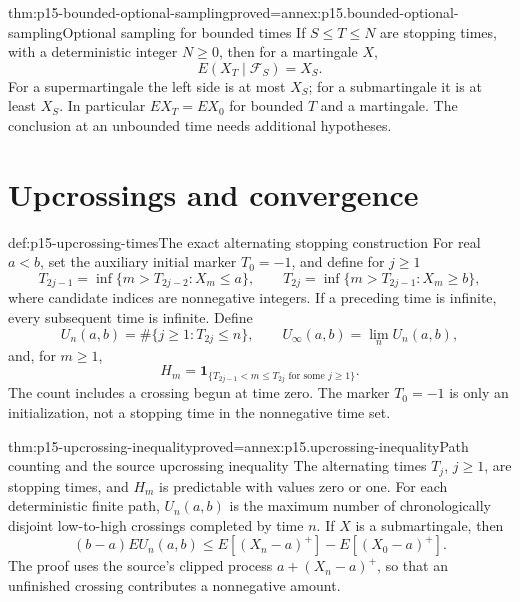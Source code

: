 \begin{hbtheorem}{thm:p15-bounded-optional-sampling}{proved=annex:p15.bounded-optional-sampling}{Optional sampling for bounded times}
If \(S\leq T\leq N\) are stopping times, with a deterministic
integer \(N\geq0\),
then for a martingale \(X\),
\[
                              E(X_T\mid\mathcal F_S)=X_S.
\]
For a supermartingale the left side is at most \(X_S\); for a
submartingale it is at least \(X_S\).
In particular \(EX_T=EX_0\) for bounded \(T\) and a martingale.
The conclusion at an unbounded time needs additional hypotheses.
\end{hbtheorem}

\section{Upcrossings and convergence}
\label{sec:p15-martingale-upcrossings}

\begin{hbdefinition}{def:p15-upcrossing-times}{The exact alternating stopping construction}
For real \(a<b\), set the auxiliary initial marker \(T_0=-1\), and define
for \(j\geq1\)
\[
 T_{2j-1}=\inf\{m>T_{2j-2}:X_m\leq a\},\qquad
 T_{2j}=\inf\{m>T_{2j-1}:X_m\geq b\},
\]
where candidate indices are nonnegative integers.
If a preceding time is infinite, every subsequent time is infinite.
Define
\[
 U_n(a,b)=\#\{j\geq1:T_{2j}\leq n\},\qquad
 U_\infty(a,b)=\lim_nU_n(a,b),
\]
and, for \(m\geq1\),
\[
 H_m=\mathbf1_{\{T_{2j-1}<m\leq T_{2j}\text{ for some }j\geq1\}}.
\]
The count includes a crossing begun at time zero. The marker \(T_0=-1\)
is only an initialization, not a stopping time in the nonnegative time set.
\end{hbdefinition}

\begin{hbtheorem}{thm:p15-upcrossing-inequality}{proved=annex:p15.upcrossing-inequality}{Path counting and the source upcrossing inequality}
The alternating times \(T_j\), \(j\geq1\), are stopping times, and
\(H_m\) is predictable with values zero or one.
For each deterministic finite path, \(U_n(a,b)\) is the maximum number
of chronologically disjoint low-to-high crossings completed by time \(n\).
If \(X\) is a submartingale, then
\[
                 (b-a)EU_n(a,b)
                      \leq E[(X_n-a)^+]-E[(X_0-a)^+].
\]
The proof uses the source's clipped process \(a+(X_n-a)^+\), so that
an unfinished crossing contributes a nonnegative amount.
\end{hbtheorem}

